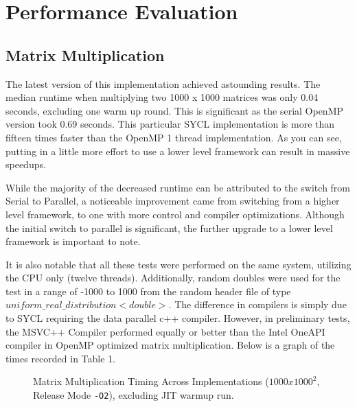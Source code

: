 \documentclass[journal]{IEEEtran}
\begin{document}
\section{Performance Evaluation}
\subsection{Matrix Multiplication}
\par The latest version of this implementation achieved astounding results. The median runtime when multiplying two 1000 x 1000 matrices was only 0.04 seconds, excluding one warm up round. This is significant as the serial OpenMP version took 0.69 seconds. This particular SYCL implementation is more than fifteen times faster than the OpenMP 1 thread implementation. As you can see, putting in a little more effort to use a lower level framework can result in massive speedups. 
\par While the majority of the decreased runtime can be attributed to the switch from Serial to Parallel, a noticeable improvement came from switching from a higher level framework, to one with more control and compiler optimizations. Although the initial switch to parallel is significant, the further upgrade to a lower level framework is important to note.
\par It is also notable that all these tests were performed on the same system, utilizing the CPU only (twelve threads). Additionally, random doubles were used for the test in a range of -1000 to 1000 from the random header file of type $\mathit{uniform\_real\_distribution<double>}$. The difference in compilers is simply due to SYCL requiring the data parallel c++ compiler. However, in preliminary tests, the MSVC++ Compiler performed equally or better than the Intel OneAPI compiler in OpenMP optimized matrix multiplication.
Below is a graph of the times recorded in Table 1.

\begin{figure}[H]
\centering
{}
\caption{Matrix Multiplication Timing Across Implementations ($1000x1000^2$, Release Mode \texttt{-O2}), excluding JIT warmup run.}
\label{fig:timing_graph}
\end{figure}
\end{document}
